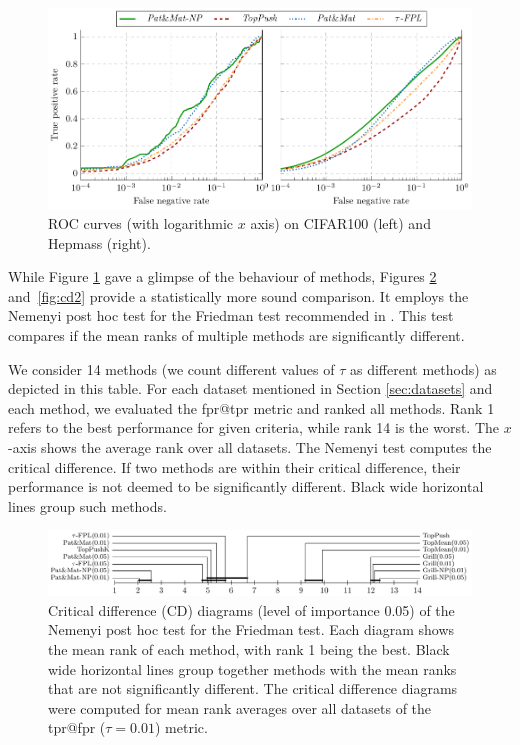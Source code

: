 \begin{figure}[!ht]
  \centering
  \includegraphics[width = \linewidth]{images/primal_results.pdf}
  \caption{ROC curves (with logarithmic $x$ axis) on CIFAR100 (left) and Hepmass (right).}
  \label{fig:ptau}
\end{figure}

While Figure \ref{fig:ptau} gave a glimpse of the behaviour of methods, Figures \ref{fig:cd1} and~\ref{fig:cd2} provide a statistically more sound comparison. It employs the Nemenyi post hoc test for the Friedman test recommended in \cite{demvsar2006statistical}. This test compares if the mean ranks of multiple methods are significantly different.

We consider 14 methods (we count different values of $\tau$ as different methods) as depicted in this table. For each dataset mentioned in Section \ref{sec:datasets} and each method, we evaluated the fpr@tpr metric and ranked all methods. Rank 1 refers to the best performance for given criteria, while rank 14 is the worst. The $x$-axis shows the average rank over all datasets. The Nemenyi test computes the critical difference. If two methods are within their critical difference, their performance is not deemed to be significantly different. Black wide horizontal lines group such methods.

\begin{figure}[!ht]
  \centering
  \includegraphics[width = \linewidth]{images/crit_diag_fpr_1.pdf}
  \caption{Critical difference (CD) diagrams (level of importance 0.05) of the Nemenyi post hoc test for the Friedman test. Each diagram shows the mean rank of each method, with rank 1 being the best. Black wide horizontal lines group together methods with the mean ranks that are not significantly different. The critical difference diagrams were computed for mean rank averages over all datasets of the tpr@fpr ($\tau=0.01$) metric.}
  \label{fig:cd1}
\end{figure}

